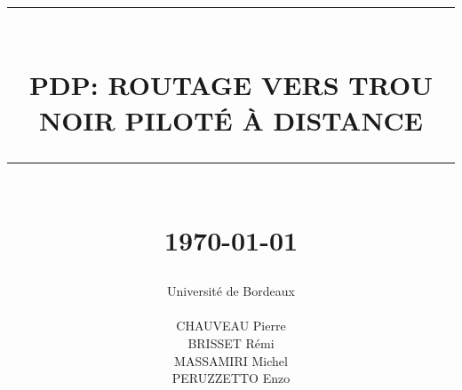 \documentclass[11pt]{report}
\newcommand{\HRule}[1]{\rule{\linewidth}{#1}}
\begin{document}
\title
{
	\Large{}
	\HRule{2pt} \\ [0.5cm]
	\LARGE \textbf{\uppercase{PDP: Routage vers trou noir piloté à distance}}
	\HRule{2pt} \\ [0.5cm]
    	\normalsize \today
}

\date{}


\author
{
	\LARGE{Université de Bordeaux} \\
	\\
    CHAUVEAU Pierre\\
    BRISSET Rémi\\
    MASSAMIRI Michel \\
    PERUZZETTO Enzo \\
}

\maketitle
\tableofcontents






\end{document}
